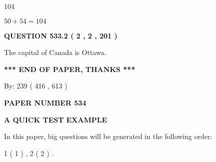 \documentclass[12pt]{article}
\begin{document}
104
 
 
 
 
\noindent{}

$ %
50 +  %
54=   %
104$
 
 
  
\vspace{0.2in}
  
{\textbf{\Large{QUESTION
533.2 
 ( 2 , 2 , 201 )
}}}
  
  
 
 
\noindent{}
 
 
The capital of Canada is Ottawa.
 
 
 
 
   
   
 \vspace{0.2in}
 
   
   
   
   
\vspace{1.0in} 
{\textbf{\large{ *** END OF PAPER, THANKS *** }}} 
   
   
\hspace{1.0in} By: 
 239 ( 416 ,  613 )
   
   
   
   
\newpage 
\setcounter{page}{ 
   534001 } 
   
   
   
   
 {\textbf{ \Large{ PAPER NUMBER  534  }}}
   
   
\vspace{0.2in}
   
   
   
   
   
   
 \vspace{0.2in}
{\LARGE {\textbf{ A QUICK TEST EXAMPLE}}}
   
   
   
\vspace{0.2in}
   
In this paper, big questions will be generated in the following order: 
   
   
   1 ( 1 )
 ,
   2 ( 2 )
 .
  
\vspace{0.2in}
  
\end{document}
